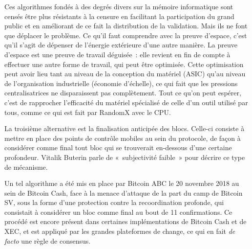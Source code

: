 Ces algorithmes fondés à des degrés divers sur la mémoire informatique sont censés être plus résistants à la censure en facilitant la participation du grand public et en améliorant de ce fait la distribution de la validation. Mais ils ne font que déplacer le problème. Ce qu'il faut comprendre avec la preuve d'espace, c'est qu'il s'agit de dépenser de l'énergie extérieure d'une autre manière. La preuve d'espace est une preuve de travail déguisée~: elle revient en fin de compte à effectuer une autre forme de travail, qui peut être optimisée. Cette optimisation peut avoir lieu tant au niveau de la conception du matériel (ASIC) qu'au niveau de l'organisation industrielle (économie d'échelle), ce qui fait que les pressions centralisatrices ne disparaissent pas complètement. Tout ce qu'on peut espérer, c'est de rapprocher l'efficacité du matériel spécialisé de celle d'un outil utilisé par tous, comme ce qui est fait par RandomX avec le CPU.


La troisième alternative est la finalisation anticipée des blocs. Celle-ci consiste à mettre en place des points de contrôle mobiles au sein du protocole, de façon à considérer comme final tout bloc qui se trouverait en-dessous d'une certaine profondeur. Vitalik Buterin parle de «~subjectivité faible~» pour décrire ce type de mécanisme.

Un tel algorithme a été mis en place par Bitcoin ABC le 20 novembre 2018 au sein de Bitcoin Cash, face à la menace d'attaque de la part du camp de Bitcoin SV, sous la forme d'une protection contre la recoordination profonde, qui consistait à considérer un bloc comme final au bout de 11 confirmations. Ce procédé est encore présent dans certaines implémentations de Bitcoin Cash et de XEC, et est appliqué par les grandes plateformes de change, ce qui en fait \emph{de facto} une règle de consensus. %

